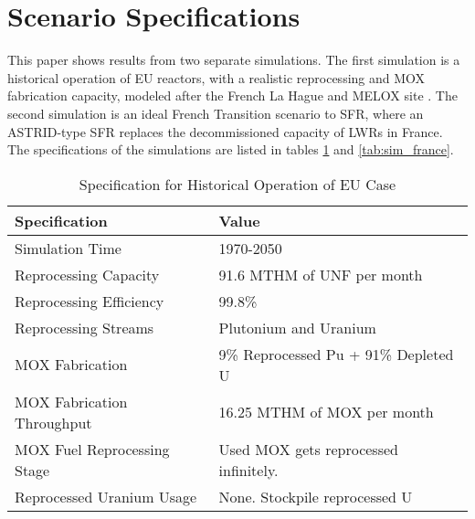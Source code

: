 \section{Scenario Specifications}
This paper shows results from two separate simulations.
The first simulation is a historical operation of \gls{EU} reactors, with a
realistic reprocessing and \gls{MOX} fabrication capacity, 
modeled after the French La Hague and MELOX site \cite{schneider_spent_2008, hugelmann_melox_1999}.
The second simulation is an ideal French Transition scenario to \gls{SFR},
where an ASTRID-type \gls{SFR} replaces the decommissioned
capacity of \glspl{LWR} in France. The specifications of the simulations
are listed in tables \ref{tab:sim_eu} and \ref{tab:sim_france}.

\begin{table}[h]
	\centering
	\begin{tabularx}{\textwidth}{bb}
		\hline
		\textbf{Specification} &\textbf{ Value} \\
		\hline
		Simulation Time & 1970-2050 \\ 
		Reprocessing Capacity & 91.6 MTHM of \gls{UNF} per month \cite{schneider_spent_2008} \\
		Reprocessing Efficiency & 99.8\% \\
		Reprocessing Streams & Plutonium and Uranium \\
		\gls{MOX} Fabrication & \small{9\% Reprocessed Pu + 91\% Depleted U} \\
		\gls{MOX} Fabrication Throughput & 16.25 MTHM of \gls{MOX} per month  \cite{hugelmann_melox_1999} \\
		\gls{MOX} Fuel Reprocessing Stage &  Used \gls{MOX} gets reprocessed infinitely. \\  
		Reprocessed Uranium Usage &  None. Stockpile reprocessed U \\
		\hline
	\end{tabularx}
	\caption {Specification for Historical Operation of \gls{EU} Case}
	\label{tab:sim_eu}
\end{table}


